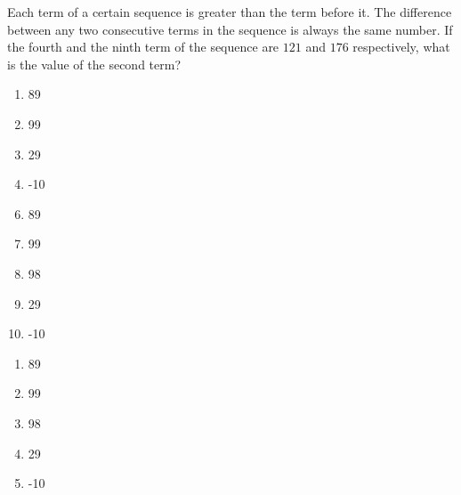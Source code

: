 Each term of a certain sequence is greater than the term
before it.  The difference between any two consecutive
terms in the sequence is always the same number.  If
the fourth and the ninth term of the sequence are $121$
and $176$ respectively, what is the value of the second term?




\ifsat
	\begin{enumerate}[label=\Alph*)]
		\item 89
		\item 99%
		\item 29
		\item -10
	\end{enumerate}
\else
\fi

\ifacteven
	\begin{enumerate}[label=\textbf{\Alph*.},itemsep=\fill,align=left]
		\setcounter{enumii}{5}
		\item 89
		\item 99%
		\item 98
		\addtocounter{enumii}{1}
		\item 29
		\item -10
	\end{enumerate}
\else
\fi

\ifactodd
	\begin{enumerate}[label=\textbf{\Alph*.},itemsep=\fill,align=left]
		\item 89
		\item 99%
		\item 98
		\item 29
		\item -10
	\end{enumerate}
\else
\fi

%
		
\else
\fi

